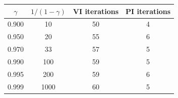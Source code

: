 \begin{tabular}{cccc}
\toprule
$\gamma$ & $1/(1-\gamma)$ & VI iterations & PI iterations \\
\midrule
0.900 & 10 & 50 & 4 \\
0.950 & 20 & 55 & 6 \\
0.970 & 33 & 57 & 5 \\
0.990 & 100 & 59 & 5 \\
0.995 & 200 & 59 & 6 \\
0.999 & 1000 & 60 & 5 \\
\bottomrule
\end{tabular}